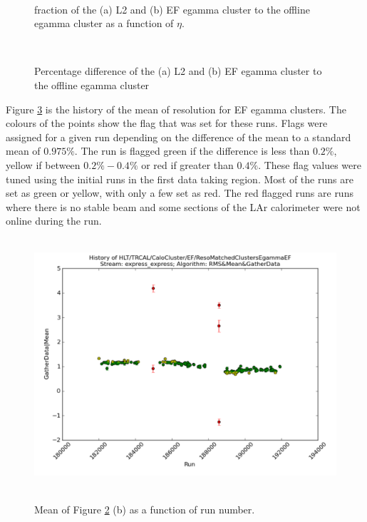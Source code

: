 \begin{figure}
\centering
\mbox{
   \quad
      \quad
}
\caption[\et{} fraction of L2 and EF to offline egamma objects]{\et{} fraction of the (a) L2 and (b) EF egamma cluster to the offline egamma cluster \et{} as a function of $\eta$. \label{SW_egamma_L2EF_EtFrac}}
\end{figure}

\begin{figure}
\centering
\mbox{
   \quad
      \quad
}
\caption[Offline egamma \et{} versus L2/EF egamma \et{}]{Percentage difference of the (a) L2 and (b) EF egamma cluster \et{} to the offline egamma cluster \et{}\label{SW_egamma_L2EF_Reso}}
\end{figure}


Figure \ref{SW_egamma_EF_Reso_Range} is the history of the mean of \et{} resolution for EF egamma clusters.
The colours of the points show the flag that was set for these runs.
Flags were assigned for a given run depending on the difference of the mean to a standard mean of $0.975\%$. 
The run is flagged green if the difference is less than $0.2\%$, yellow if between $0.2\% - 0.4\%$ or red if greater than $0.4\%$.
These flag values were tuned using the initial runs in the first data taking region.
Most of the runs are set as green or yellow, with only a few set as red.
The red flagged runs are runs where there is no stable beam and some sections of the LAr calorimeter were not online during the run.


\begin{figure}
\centering
\mbox{
   \includegraphics[width=1.0\textwidth]{figures/ServiceWork/EF_Reso_Range.pdf}
}
\caption[Offline egamma \et{} versus L2/EF egamma \et{}]{Mean of Figure \ref{SW_egamma_L2EF_Reso} (b) as a function of run number. \label{SW_egamma_EF_Reso_Range}}
\end{figure}

